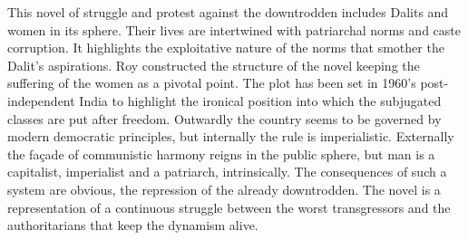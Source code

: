 This  novel  of  struggle  and  protest  against  the  downtrodden  includes  Dalits  and  women  in  its  sphere.  Their  lives  are  intertwined  with  patriarchal  norms  and  caste  corruption.  It  highlights  the  exploitative  nature  of  the  norms  that  smother  the  Dalit’s  aspirations.  Roy  constructed  the  structure  of  the  novel  keeping  the  suffering  of  the  women  as  a  pivotal  point.  The  plot  has  been  set  in  1960’s  post-independent  India  to  highlight  the  ironical  position  into  which  the  subjugated  classes  are  put  after  freedom.  Outwardly  the  country  seems  to  be  governed  by  modern  democratic  principles,  but  internally  the  rule  is  imperialistic.  Externally  the  façade  of  communistic  harmony  reigns  in  the  public  sphere,  but  man  is  a  capitalist,  imperialist  and  a  patriarch,  intrinsically.  The  consequences  of  such  a  system  are  obvious,  the  repression  of  the  already  downtrodden.  The  novel  is  a  representation  of  a  continuous  struggle  between  the  worst  transgressors  and  the  authoritarians  that  keep  the  dynamism  alive.